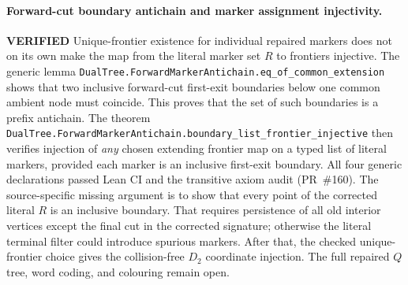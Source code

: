 \documentclass[11pt]{article}
\newcommand{\ok}{\textcolor{green!40!black}{\textbf{VERIFIED}}}
\newcommand{\lean}[1]{\texttt{#1}}
\begin{document}
\paragraph{Forward-cut boundary antichain and marker assignment injectivity.} \ok
Unique-frontier existence for individual repaired markers
does not on its own make the map from the literal marker
set $R$ to frontiers injective. The generic lemma
\lean{DualTree.ForwardMarkerAntichain.eq_of_common_extension}
shows that two inclusive forward-cut first-exit boundaries
below one common ambient node must coincide. This proves
that the set of such boundaries is a prefix antichain.
The theorem
\lean{DualTree.ForwardMarkerAntichain.boundary_list_frontier_injective}
then verifies injection of \emph{any} chosen extending
frontier map on a typed list of literal markers, provided
each marker is an inclusive first-exit boundary.
All four generic declarations passed Lean CI and the transitive axiom audit (PR~\#160). The source-specific missing argument is to show
that every point of the corrected literal $R$ is an
inclusive boundary. That requires persistence of all
old interior vertices except the final cut in the
corrected signature; otherwise the literal terminal
filter could introduce spurious markers.
After that, the checked unique-frontier choice gives
the collision-free $D_2$ coordinate injection.
The full repaired $Q$ tree, word coding, and colouring
remain open.
\end{document}
